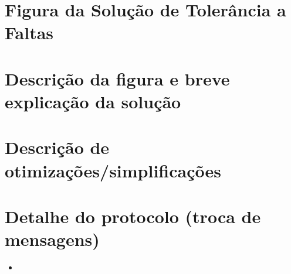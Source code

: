 \documentclass[a4paper]{article}
\begin{document}
\section{Figura da Solução de Tolerância a Faltas}
\section{Descrição da figura e breve explicação da solução}
\section{Descrição de otimizações/simplificações}
\section{Detalhe do protocolo (troca de mensagens)}
\begin{itemize}
\item 
\end{itemize}
\end{document}
